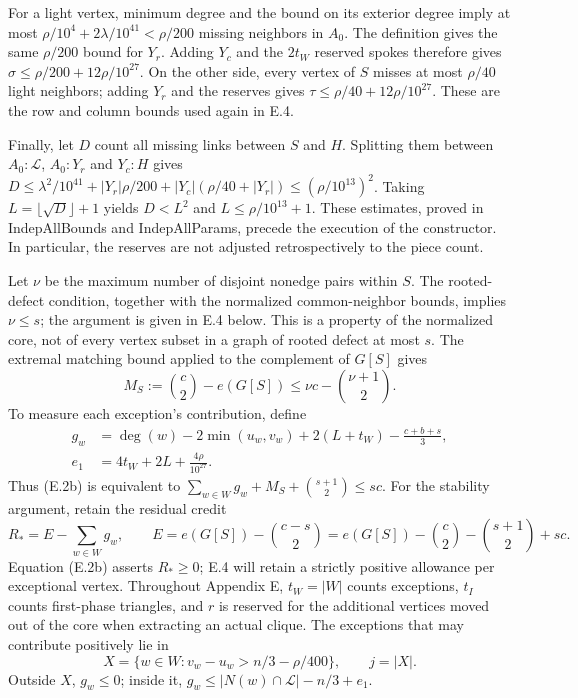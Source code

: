 \documentclass[english,11pt,a4paper]{article}
\newcounter{none}
\begin{document}
For a light vertex, minimum degree and the bound on its exterior degree imply at most \(\rho/10^4+2\lambda/10^{41}<\rho/200\) missing neighbors in \(A_0\). The definition gives the same \(\rho/200\) bound for \(Y_r\). Adding \(Y_c\) and the \(2t_W\) reserved spokes therefore gives \(\sigma\le\rho/200+12\rho/10^{27}\). On the other side, every vertex of \(S\) misses at most \(\rho/40\) light neighbors; adding \(Y_r\) and the reserves gives \(\tau\le\rho/40+12\rho/10^{27}\). These are the row and column bounds used again in E.4.

Finally, let \(D\) count all missing links between \(S\) and \(H\). Splitting them between \(A_0\!:\!\mathcal L\), \(A_0\!:\!Y_r\) and \(Y_c\!:\!H\) gives \(D\le\lambda^2/10^{41}+|Y_r|\rho/200+|Y_c|(\rho/40+|Y_r|)\le(\rho/10^{13})^2\). Taking \(L=\lfloor\sqrt D\rfloor+1\) yields \(D<L^2\) and \(L\le\rho/10^{13}+1\). These estimates, proved in {\ttfamily\small IndepAllBoun\discretionary{\hbox{\ensuremath{\hookrightarrow}}}{}{}ds} and {\ttfamily\small IndepAllPara\discretionary{\hbox{\ensuremath{\hookrightarrow}}}{}{}ms}, precede the execution of the constructor. In particular, the reserves are not adjusted retrospectively to the piece count.

Let \(\nu\) be the maximum number of disjoint nonedge pairs within \(S\). The rooted-defect condition, together with the normalized common-neighbor bounds, implies \(\nu\le s\); the argument is given in E.4 below. This is a property of the normalized core, not of every vertex subset in a graph of rooted defect at most \(s\). The extremal matching bound applied to the complement of \(G[S]\) gives \[
M_S:=\binom c2-e(G[S])\le \nu c-\binom{\nu+1}2.
\] To measure each exception's contribution, define \[
\begin{split}
g_w&=\deg(w)-2\min(u_w,v_w)+2(L+t_W)-\frac{c+b+s}{3},\\
e_1&=4t_W+2L+\frac{4\rho}{10^{27}}.
\end{split}
\] Thus (E.2b) is equivalent to \(\sum_{w\in W}g_w+M_S+\binom{s+1}2\le sc\). For the stability argument, retain the residual credit \[
R_*=E-\sum_{w\in W}g_w,\qquad
E=e(G[S])-\binom{c-s}{2}
  =e(G[S])-\binom c2-\binom{s+1}2+sc.
\] Equation (E.2b) asserts \(R_*\ge0\); E.4 will retain a strictly positive allowance per exceptional vertex. Throughout Appendix E, \(t_W=|W|\) counts exceptions, \(t_I\) counts first-phase triangles, and \(r\) is reserved for the additional vertices moved out of the core when extracting an actual clique. The exceptions that may contribute positively lie in \[
X=\{w\in W:v_w-u_w>n/3-\rho/400\},\qquad j=|X|.
\] Outside \(X\), \(g_w\le0\); inside it, \(g_w\le |N(w)\cap\mathcal L|-n/3+e_1\).
\end{document}
